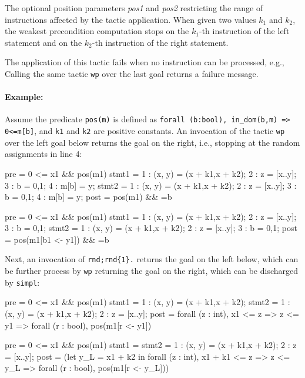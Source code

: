 The optional position parameters \textit{pos1} and \textit{pos2}
restricting the range of instructions affected by the tactic
application. When given two values $k_1$ and $k_2$, the weakest
precondition computation stops on the $k_1$-th instruction of the left
statement and on the $k_2$-th instruction of the right statement.

The application of this tactic fails when no instruction can be
processed, e.g., Calling the same tactic \verb+wp+ over the last goal
returns a failure message.

  

\paragraph{Example:} Assume the predicate \verb+pos(m)+ is defined as
\verb+forall (b:bool), in_dom(b,m) => 0<=m[b]+, and \verb+k1+ and
\verb+k2+ are positive constants. An invocation of the tactic
\verb+wp+ over the left goal below returns the goal on the right,
i.e., stopping at the random assignments in line 4:

\begin{minicode}{0.5}

pre   = 0 <= x{1} && pos(m{1})
stmt1 =   1 : (x, y) = (x + k1,x + k2);
          2 : z = [x..y];
          3 : b = {0,1};
          4 : m[b] = y;
stmt2 =   1 : (x, y) = (x + k1,x + k2);
          2 : z = [x..y];
          3 : b = {0,1};
          4 : m[b] = y;
post  = pos(m{1}) && ={b}

\end{minicode}
\begin{minicode}{0.5}

pre   = 0 <= x{1} && pos(m{1})
stmt1 =   1 : (x, y) = (x + k1,x + k2);
          2 : z = [x..y];
          3 : b = {0,1};
stmt2 =   1 : (x, y) = (x + k1,x + k2);
          2 : z = [x..y];
          3 : b = {0,1};
post  = pos(m{1}[b{1} <- y{1}]) && ={b}

\end{minicode}

Next, an invocation of \verb+rnd;rnd{1}.+ returns the goal on the left
below, which can be further process by \verb+wp+ returning the goal on
the right, which can be discharged by \verb+simpl+:

\begin{minicode}{0.5}

pre   = 0 <= x{1} && pos(m{1})
stmt1 =   1 : (x, y) = (x + k1,x + k2);
stmt2 =   1 : (x, y) = (x + k1,x + k2);
          2 : z = [x..y];
post  = forall (z : int),
          x{1} <= z => z <= y{1} => 
            forall (r : bool),  
              pos(m{1}[r <- y{1}])
\end{minicode}
\begin{minicode}{0.5}

pre   = 0 <= x{1} && pos(m{1})
stmt1 = 
stmt2 =   1 : (x, y) = (x + k1,x + k2);
          2 : z = [x..y];
post  = (let y_L = x{1} + k2 in
        forall (z : int),
          x{1} + k1 <= z => z <= y_L =>
            forall (r : bool),  
              pos(m{1}[r <- y_L]))

\end{minicode}


